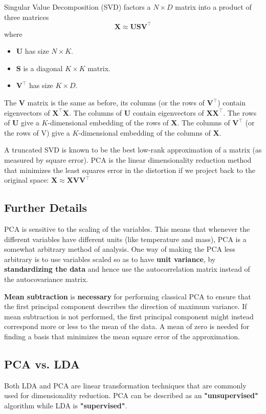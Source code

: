 \documentclass[a4paper, 12pt]{book} %
\begin{document}
Singular Value Decomposition (SVD) factors a $N\times D$ matrix into a product of three matrices
$$\mathbf{X} \approx \mathbf{U}\mathbf{S}\mathbf{V}^{\top}$$
where
\begin{itemize}
\item $\mathbf{U}$ has size $N\times K$.
\item $\mathbf{S}$ is a diagonal $K \times K$ matrix.
\item $\mathbf{V}^\top$ has size $K \times D$.
\end{itemize}
The $\mathbf{V}$ matrix is the same as before, its columns (or the rows of $\mathbf{V}^\top$) contain eigenvectors of $\mathbf{X}^\top \mathbf{X}$. The columns of $\mathbf{U}$ contain eigenvectors of $\mathbf{X}\mathbf{X}^\top$. The rows of $\mathbf{U}$ give a $K$-dimensional embedding of the rows of $\mathbf{X}$. The columns of $\mathbf{V}^\top$ (or the rows of V) give a $K$-dimensional embedding of the columns of $\mathbf{X}$. 

A truncated SVD is known to be the best low-rank approximation of a matrix (as measured by square error). PCA is the linear dimensionality reduction method that minimizes the least squares error in the distortion if we project back to the original space: $\mathbf{X}\approx \mathbf{X}\mathbf{V}\mathbf{V}^\top$

\subsection{Further Details}
PCA is sensitive to the scaling of the variables. This means that whenever the different variables have different units (like temperature and mass), PCA is a somewhat arbitrary method of analysis. One way of making the PCA less arbitrary is to use variables scaled so as to have \textbf{unit variance}, by \textbf{standardizing the data} and hence use the autocorrelation matrix instead of the autocovariance matrix.

\textbf{Mean subtraction} is \textbf{necessary} for performing classical PCA to ensure that the first principal component describes the direction of maximum variance. If mean subtraction is not performed, the first principal component might instead correspond more or less to the mean of the data. A mean of zero is needed for finding a basis that minimizes the mean square error of the approximation.  

\subsection{PCA vs. LDA}
Both LDA and PCA are linear transformation techniques that are commonly used for dimensionality reduction. PCA can be described as an \textbf{"unsupervised"} algorithm while LDA is \textbf{"supervised"}.
\end{document}
